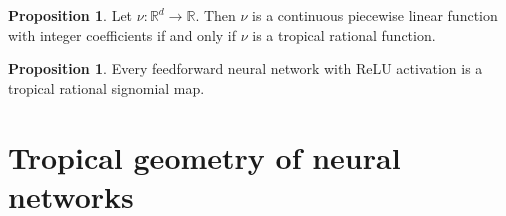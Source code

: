 \documentclass{article}
\theoremstyle{definition}
\newtheorem{proposition}[theorem]{Proposition}
\newtheorem{comment}[theorem]{Comment}
\begin{document}
\begin{proposition}
Let $\nu : \mathbb{R}^{d} \to \mathbb{R}$. Then $\nu$ is a continuous piecewise linear function with integer coefficients if and only if $\nu$ is a tropical rational function.
\end{proposition}

\begin{proposition}
Every feedforward neural network with ReLU activation is a tropical rational signomial map.
\end{proposition}
\newpage

\section{Tropical geometry of neural networks}
\label{sec:tropical_geometry_of_neural_networks}

\newpage

\end{document}
